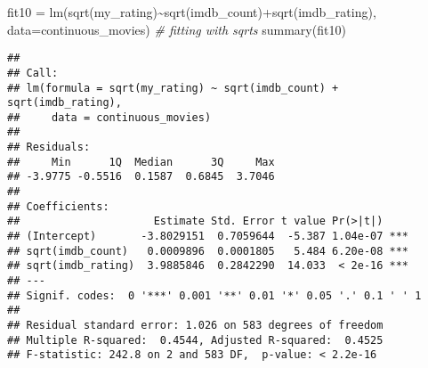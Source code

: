 \documentclass[
]{article}
\newenvironment{Shaded}{\begin{snugshade}}{\end{snugshade}}
\newcommand{\AttributeTok}[1]{\textcolor[rgb]{0.77,0.63,0.00}{#1}}
\newcommand{\CommentTok}[1]{\textcolor[rgb]{0.56,0.35,0.01}{\textit{#1}}}
\newcommand{\FunctionTok}[1]{\textcolor[rgb]{0.00,0.00,0.00}{#1}}
\newcommand{\NormalTok}[1]{#1}
\newcommand{\OtherTok}[1]{\textcolor[rgb]{0.56,0.35,0.01}{#1}}
\newcommand{\SpecialCharTok}[1]{\textcolor[rgb]{0.00,0.00,0.00}{#1}}
\begin{document}
\begin{Shaded}
\begin{Highlighting}[]
\NormalTok{fit10 }\OtherTok{=} \FunctionTok{lm}\NormalTok{(}\FunctionTok{sqrt}\NormalTok{(my\_rating)}\SpecialCharTok{\textasciitilde{}}\FunctionTok{sqrt}\NormalTok{(imdb\_count)}\SpecialCharTok{+}\FunctionTok{sqrt}\NormalTok{(imdb\_rating), }\AttributeTok{data=}\NormalTok{continuous\_movies) }\CommentTok{\# fitting with sqrts}
\FunctionTok{summary}\NormalTok{(fit10)}
\end{Highlighting}
\end{Shaded}

\begin{verbatim}
## 
## Call:
## lm(formula = sqrt(my_rating) ~ sqrt(imdb_count) + sqrt(imdb_rating), 
##     data = continuous_movies)
## 
## Residuals:
##     Min      1Q  Median      3Q     Max 
## -3.9775 -0.5516  0.1587  0.6845  3.7046 
## 
## Coefficients:
##                     Estimate Std. Error t value Pr(>|t|)    
## (Intercept)       -3.8029151  0.7059644  -5.387 1.04e-07 ***
## sqrt(imdb_count)   0.0009896  0.0001805   5.484 6.20e-08 ***
## sqrt(imdb_rating)  3.9885846  0.2842290  14.033  < 2e-16 ***
## ---
## Signif. codes:  0 '***' 0.001 '**' 0.01 '*' 0.05 '.' 0.1 ' ' 1
## 
## Residual standard error: 1.026 on 583 degrees of freedom
## Multiple R-squared:  0.4544, Adjusted R-squared:  0.4525 
## F-statistic: 242.8 on 2 and 583 DF,  p-value: < 2.2e-16
\end{verbatim}
\end{document}
